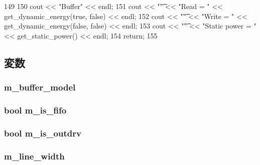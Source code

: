 \begin{DoxyCode}
149 {
150     cout << "Buffer" << endl;
151     cout << "\t" << "Read = " << get_dynamic_energy(true, false) << endl;
152     cout << "\t" << "Write = " << get_dynamic_energy(false, false) << endl;
153     cout << "\t" << "Static power = " << get_static_power() << endl;
154     return;
155 }
\end{DoxyCode}


\subsection{変数}
\hypertarget{classBuffer_a9834deea607a93506904e1f399737596}{
\subsubsection[{m\_\-buffer\_\-model}]{ {\bf m\_\-buffer\_\-model}}}
\label{classBuffer_a9834deea607a93506904e1f399737596}
\hypertarget{classBuffer_a6278bce84ca8f1587dbb706ad2d20012}{
\subsubsection[{m\_\-is\_\-fifo}]{\setlength{\rightskip}{0pt plus 5cm}bool {\bf m\_\-is\_\-fifo}}}
\label{classBuffer_a6278bce84ca8f1587dbb706ad2d20012}
\hypertarget{classBuffer_abf268b469077bf0460d0043b68443b6a}{
\subsubsection[{m\_\-is\_\-outdrv}]{\setlength{\rightskip}{0pt plus 5cm}bool {\bf m\_\-is\_\-outdrv}}}
\label{classBuffer_abf268b469077bf0460d0043b68443b6a}
\hypertarget{classBuffer_add4c54b54475120d0e1547d3a9c48f44}{
\subsubsection[{m\_\-line\_\-width}]{ {\bf m\_\-line\_\-width}}}
